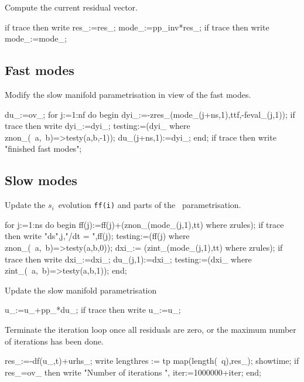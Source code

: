 \documentclass[11pt,a5paper]{article}
\begin{document}
Compute the current residual vector.
\begin{reduce}
  if trace then write res_:=res_;
  mode_:=pp_inv*res_;
  if trace then write mode_:=mode_;
\end{reduce}




\subsection{Fast modes}

Modify the slow manifold parametrisation in view of the fast
modes.
\begin{reduce}
  du_:=ov_;
  for j:=1:nf do begin  
    dyi_:=-zres_(mode_(j+ns,1),ttf,-feval_(j,1));
    if trace then write dyi_:=dyi_;
    testing:=(dyi_ where znon_(~a,~b)=>testy(a,b,-1));
    du_(j+ns,1):=dyi_;
  end;
if trace then write "finished fast modes";%
\end{reduce}



\subsection{Slow modes}

Update the $s_i$~evolution \verb|ff(i)| and parts of the
\uv~parametrisation. 
\begin{reduce}
  for j:=1:ns do begin
    ff(j):=ff(j)+(znon_(mode_(j,1),tt) where zrules);
    if trace then write "ds",j,"/dt = ",ff(j);
    testing:=(ff(j) where znon_(~a,~b)=>testy(a,b,0));
    dxi_:= (zint_(mode_(j,1),tt) where zrules);
    if trace then write dxi_:=dxi_;
    du_(j,1):=dxi_;
    testing:=(dxi_ where zint_(~a,~b)=>testy(a,b,1));
  end;
\end{reduce}

Update the slow manifold parametrisation
\begin{reduce}
  u_:=u_+pp_*du_;
  if trace then write u_:=u_;
\end{reduce}


Terminate the iteration loop once all residuals are zero,
or the maximum number of iterations has been done.
\begin{reduce}
  res_:=-df(u_,t)+urhs_;
  write lengthres := tp map(length(~q),res_);
  showtime;
  if res_=ov_ then write "Number of iterations ",
    iter:=1000000+iter;
end;
\end{reduce}
\end{document}
